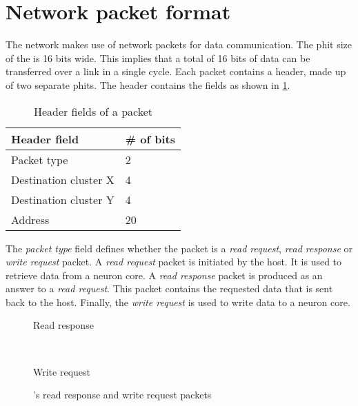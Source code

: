 \section{Network packet format}
The network makes use of network packets for data communication.
The phit size of the \confignoc{} is 16 bits wide.
This implies that a total of 16 bits of data can be transferred over a link in a single cycle.
Each packet contains a header, made up of two separate phits.
The header contains the fields as shown in \cref{tab:header_fields}.

\begin{table}[hbtp]
\centering
\begin{tabular}{@{}ll@{}}
\toprule
\textbf{Header field} & \textbf{\# of bits} \\ \midrule
Packet type           & 2                   \\
Destination cluster X & 4                   \\
Destination cluster Y & 4                   \\
Address               & 20                  \\ \bottomrule
\end{tabular}
\caption{Header fields of a \confignoc{} packet}
\label{tab:header_fields}
\end{table}

The \textit{packet type} field defines whether the packet is a \textit{read request}, \textit{read response} or \textit{write request} packet.
A \textit{read request} packet is initiated by the host.
It is used to retrieve data from a neuron core.
A \textit{read response} packet is produced as an answer to a \textit{read request}.
This packet contains the requested data that is sent back to the host.
Finally, the \textit{write request} is used to write data to a neuron core.

\hspace*{0.5em}
\begin{figure}[hbtp]
    \centering
    \begin{subcaptionblock}{\linewidth}
        \centering
        \begin{adjustbox}{width=0.7\linewidth}
            
        \end{adjustbox}
        \caption{Read response}
        \label{fig:read_response_packet}
    \end{subcaptionblock}
    \\ \vspace{1.5em}
    \begin{subcaptionblock}{\linewidth}
        \centering
        \begin{adjustbox}{width=0.7\linewidth}
            
        \end{adjustbox}
        \caption{Write request}
        \label{fig:write_request_packet}
    \end{subcaptionblock}
    \caption{\confignoc{}'s read response and write request packets}
\end{figure}

